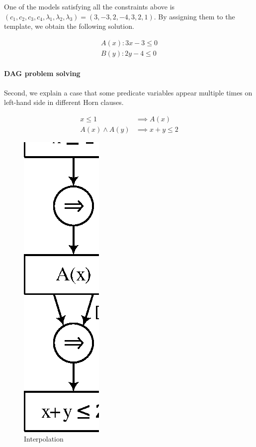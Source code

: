 One of the models satisfying all the constraints above is
$( c_1, c_2, c_3, c_4, \lambda_1, \lambda_2, \lambda_3 ) = (3, -3, 2, -4, 3, 2, 1)$.
By assigning them to the template, we obtain the following solution.

\begin{align*}
A(x) : 3 x - 3 \leq 0 \\
B(y) : 2 y - 4 \leq 0
\end{align*}

\paragraph {DAG problem solving}
Second, we explain a case that some predicate variables appear
multiple times on left-hand side in different Horn clauses.

\begin{align*}
x \leq 1 & \implies A(x) \\
A(x) \wedge A(y) & \implies x+y \leq 2
\end{align*}

\begin{figure}
\begin{center}
\includegraphics[scale=1]{figures/ex2-1.eps}
\end{center}
\caption{Interpolation}
\end{figure}

